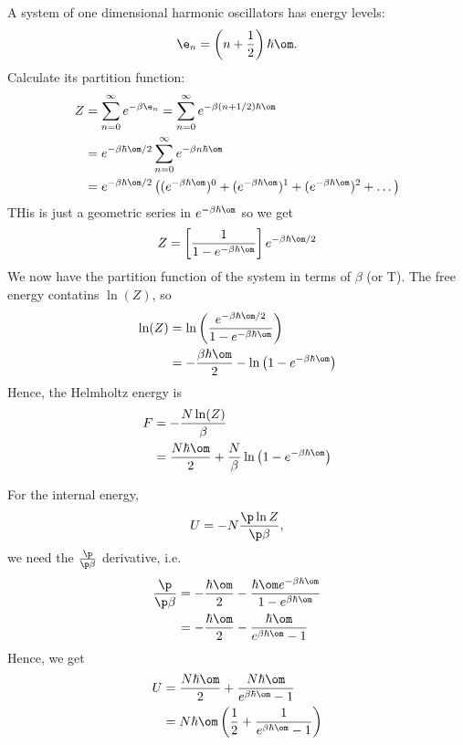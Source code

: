 \documentclass[a4paper, 11pt, normalem]{report}
\begin{document}
\chapter{}
A system of one dimensional harmonic oscillators has energy levels:
\begin{equation}
    \e_n = \left(n+\frac{1}{2}\right)\hbar\om.
\end{equation}
Calculate its partition function:
\begin{align}
    Z &= \sum_{n=0}^\infty e^{-\beta\e_n} = \sum_{n=0}^{\infty} e^{-\beta(n+1/2)\hbar\om} \\
      &= e^{-\beta\hbar\om/2}\sum_{n=0}^\infty e^{-\beta n\hbar\om} \\
      &= e^{-\beta\hbar\om/2}\left((e^{-\beta\hbar\om})^0 + (e^{-\beta\hbar\om})^1 + (e^{-\beta\hbar\om})^2 + \dots\right)
\end{align}
THis is just a geometric series in $e^{-\beta\hbar\om}$ so we get
\begin{equation}
    Z = \left[\frac{1}{1 - e^{-\beta\hbar\om}}\right]e^{-\beta\hbar\om/2}
\end{equation}
We now have the partition function of the system in terms of $\beta$ (or T).
The free energy contatins $\ln(Z)$, so
\begin{align}
    \ln(Z) &= \ln\left(\frac{e^{-\beta\hbar\om/2}}{1-e^{-\beta\hbar\om}}\right) \\
           &= -\frac{\beta\hbar\om}{2} - \ln\left(1 - e^{-\beta\hbar\om}\right)
\end{align}
Hence, the Helmholtz energy is
\begin{align}
    F &= -\frac{N\ln(Z)}{\beta} \\
      &= \frac{N\hbar\om}{2} + \frac{N}{\beta}\ln\left(1 - e^{-\beta\hbar\om}\right)
\end{align}

For the internal energy,
\begin{equation}
    U = -N\frac{\p \ln{Z}}{\p \beta},
\end{equation}
we need the $\frac{\p}{\p\beta}$ derivative, i.e.
\begin{align}
    \frac{\p}{\p\beta} &= -\frac{\hbar\om}{2} - \frac{\hbar\om e^{-\beta\hbar\om}}{1 - e^{\beta\hbar\om}} \\
                       &= -\frac{\hbar\om}{2} - \frac{\hbar\om}{e^{\beta\hbar\om} - 1}
\end{align}
Hence, we get
\begin{align}
    U &= \frac{N\hbar\om}{2} + \frac{N\hbar\om}{e^{\beta\hbar\om} - 1} \\
      &= N\hbar\om\left(\frac{1}{2} + \frac{1}{e^{\beta\hbar\om} -1}\right)
\end{align}
\end{document}
